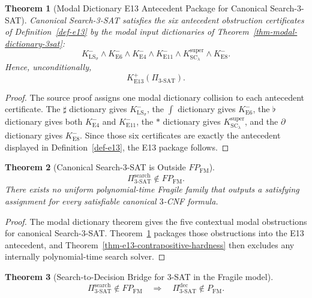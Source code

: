 \documentclass[11pt]{article}
\newtheorem{theorem}{Theorem}[section]
\theoremstyle{definition}
\theoremstyle{remark}
\newcommand{\FM}{\mathrm{FM}}
\begin{document}
\begin{theorem}[Modal Dictionary E13 Antecedent Package for Canonical Search-3-SAT]\label{ex-3sat-all-blocked}
Canonical Search-3-SAT satisfies the six antecedent obstruction certificates of Definition~\ref{def-e13} by the modal input dictionaries of Theorem~\ref{thm-modal-dictionary-3sat}:
\[
K_{\mathrm{LS}_\sigma}^- \wedge K_{\mathrm{E6}}^- \wedge K_{\mathrm{E4}}^- \wedge K_{\mathrm{E11}}^- \wedge K_{\mathrm{SC}_\lambda}^{\mathrm{super}} \wedge K_{\mathrm{E8}}^-.
\]
Hence, unconditionally,
\[
K_{\mathrm{E13}}^+(\Pi_{3\text{-SAT}}).
\]
\end{theorem}

\begin{proof}
The source proof assigns one modal dictionary collision to each antecedent certificate. The $\sharp$ dictionary gives $K_{\mathrm{LS}_\sigma}^-$, the $\int$ dictionary gives $K_{\mathrm{E6}}^-$, the $\flat$ dictionary gives both $K_{\mathrm{E4}}^-$ and $K_{\mathrm{E11}}^-$, the $\ast$ dictionary gives $K_{\mathrm{SC}_\lambda}^{\mathrm{super}}$, and the $\partial$ dictionary gives $K_{\mathrm{E8}}^-$. Since those six certificates are exactly the antecedent displayed in Definition~\ref{def-e13}, the E13 package follows.
\end{proof}

\begin{theorem}[Canonical Search-3-SAT is Outside $FP_{\FM}$]\label{thm-random-3sat-not-in-pfm}
\[
\Pi^{\mathrm{search}}_{3\text{-SAT}} \notin FP_{\FM}.
\]
There exists no uniform polynomial-time Fragile family that outputs a satisfying assignment for every satisfiable canonical $3$-CNF formula.
\end{theorem}

\begin{proof}
The modal dictionary theorem gives the five contextual modal obstructions for canonical Search-3-SAT. Theorem~\ref{ex-3sat-all-blocked} packages those obstructions into the E13 antecedent, and Theorem~\ref{thm-e13-contrapositive-hardness} then excludes any internally polynomial-time search solver.
\end{proof}

\begin{theorem}[Search-to-Decision Bridge for 3-SAT in the Fragile model]\label{thm-search-to-decision-3sat-fm}
\[
\Pi^{\mathrm{search}}_{3\text{-SAT}} \notin FP_{\FM}
\quad\Longrightarrow\quad
\Pi^{\mathrm{dec}}_{3\text{-SAT}} \notin P_{\FM}.
\]
\end{theorem}
\end{document}

